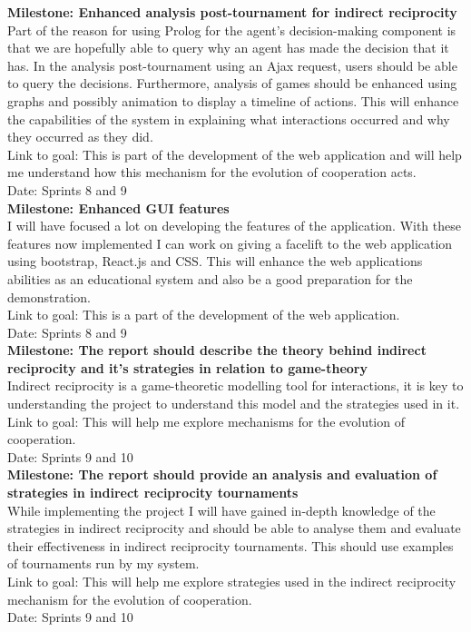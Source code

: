 \documentclass{article}
\begin{document}
\noindent\textbf{Milestone: Enhanced analysis post-tournament for indirect reciprocity}\\
Part of the reason for using Prolog for the agent's decision-making component is that we are hopefully able to query why an agent has made the decision that it has. In the analysis post-tournament using an Ajax request, users should be able to query the decisions. Furthermore, analysis of games should be enhanced using graphs and possibly animation to display a timeline of actions. This will enhance the capabilities of the system in explaining what interactions occurred and why they occurred as they did.\\
Link to goal: This is part of the development of the web application and will help me understand how this mechanism for the evolution of cooperation acts.\\
Date: Sprints 8 and 9\\

\noindent\textbf{Milestone: Enhanced GUI features}\\
I will have focused a lot on developing the features of the application. With these features now implemented I can work on giving a facelift to the web application using bootstrap, React.js and CSS. This will enhance the web applications abilities as an educational system and also be a good preparation for the demonstration.\\
Link to goal: This is a part of the development of the web application.\\
Date: Sprints 8 and 9\\

\noindent\textbf{Milestone: The report should describe the theory behind indirect reciprocity and it's strategies in relation to game-theory}\\
Indirect reciprocity is a game-theoretic modelling tool for interactions, it is key to understanding the project to understand this model and the strategies used in it.\\
Link to goal: This will help me explore mechanisms for the evolution of cooperation.\\
Date: Sprints 9 and 10\\

\noindent\textbf{Milestone: The report should provide an analysis and evaluation of strategies in indirect reciprocity tournaments}\\
While implementing the project I will have gained in-depth knowledge of the strategies in indirect reciprocity and should be able to analyse them and evaluate their effectiveness in indirect reciprocity tournaments. This should use examples of tournaments run by my system.\\
Link to goal: This will help me explore strategies used in the indirect reciprocity mechanism for the evolution of cooperation.\\
Date: Sprints 9 and 10\\
\end{document}
